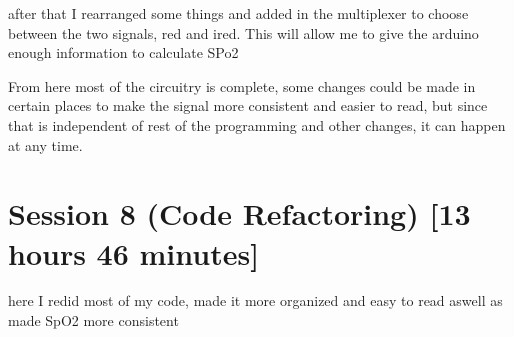 \documentclass{article}
\begin{document}
after that I rearranged some things and added in the multiplexer to choose between the two signals, red and ired. This will allow me to give the arduino enough information to calculate SPo2
\begin{center}
\end{center}
From here most of the circuitry is complete, some changes could be made in certain places to make the signal more consistent and easier to read, but since that is independent of rest of the programming and other changes, it can happen at any time.
\newpage
\section{Session 8 (Code Refactoring) [13 hours 46 minutes]}
here I redid most of my code, made it more organized and easy to read aswell as made SpO2 more consistent
\end{document}
